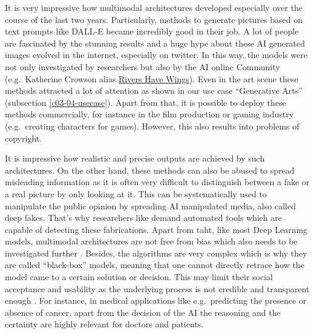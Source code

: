 \documentclass[
]{krantz}
\begin{document}
It is very impressive how multimodal architectures developed especially over the course of the last two years. Particularly, methods to generate pictures based on text prompts like DALL-E became incredibly good in their job. A lot of people are fascinated by the stunning results and a huge hype about these AI generated images evolved in the internet, especially on twitter. In this way, the models were not only investigated by researchers but also by the AI online Community (e.g.~Katherine Crowson alias \href{https://twitter.com/RiversHaveWings}{Rivers Have Wings}). Even in the art scene these methods attracted a lot of attention as shown in our use case ``Generative Arts'' (subsection \ref{c03-04-usecase}). Apart from that, it is possible to deploy these methods commercially, for instance in the film production or gaming industry (e.g.~creating characters for games). However, this also results into problems of copyright.

It is impressive how realistic and precise outputs are achieved by such architectures. On the other hand, these methods can also be abused to spread misleading information as it is often very difficult to distinguish between a fake or a real picture by only looking at it. This can be systematically used to manipulate the public opinion by spreading AI manipulated media, also called deep fakes. That's why researchers like \citet{explainaility} demand automated tools which are capable of detecting these fabrications. Apart from taht, like most Deep Learning models, multimodal architectures are not free from bias which also needs to be investigated further \citep{bias}. Besides, the algorithms are very complex which is why they are called ``black-box'' models, meaning that one cannot directly retrace how the model came to a certain solution or decision. This may limit their social acceptance and usability as the underlying process is not credible and transparent enough \citep{explainaility}. For instance, in medical applications like e.g.~predicting the presence or absence of cancer, apart from the decision of the AI the reasoning and the certainty are highly relevant for doctors and patients.
\end{document}

